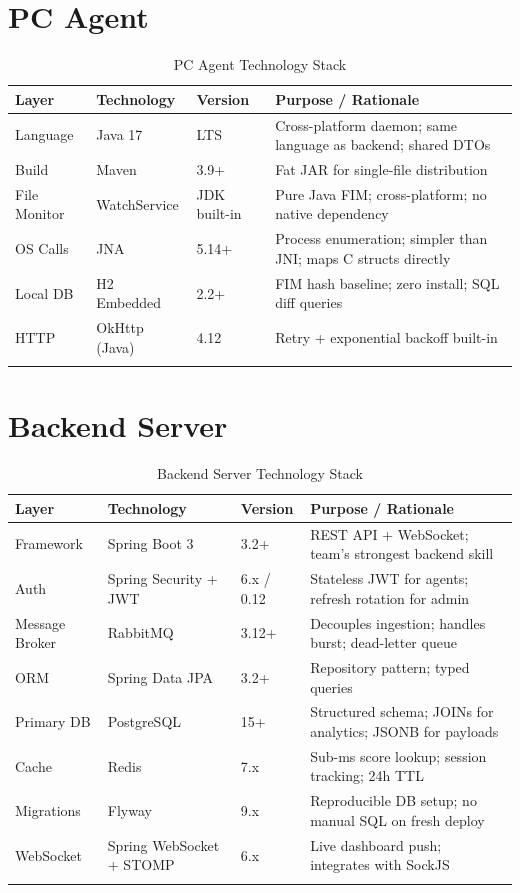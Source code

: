 \documentclass[12pt,a4paper]{report}
\begin{document}
\section{PC Agent}

\begin{longtable}{@{}p{2.5cm}p{3cm}p{2cm}p{6cm}@{}}
  \toprule
  \textbf{Layer} & \textbf{Technology} & \textbf{Version} & \textbf{Purpose / Rationale} \\
  \midrule
  \endhead
  Language    & Java 17         & LTS       & Cross-platform daemon; same language as backend; shared DTOs \\
  Build       & Maven           & 3.9+      & Fat JAR for single-file distribution \\
  File Monitor & WatchService   & JDK built-in & Pure Java FIM; cross-platform; no native dependency \\
  OS Calls    & JNA             & 5.14+     & Process enumeration; simpler than JNI; maps C structs directly \\
  Local DB    & H2 Embedded     & 2.2+      & FIM hash baseline; zero install; SQL diff queries \\
  HTTP        & OkHttp (Java)   & 4.12      & Retry + exponential backoff built-in \\
  \bottomrule
  \caption{PC Agent Technology Stack}
\end{longtable}

\section{Backend Server}

\begin{longtable}{@{}p{2.5cm}p{3.5cm}p{2cm}p{5.5cm}@{}}
  \toprule
  \textbf{Layer} & \textbf{Technology} & \textbf{Version} & \textbf{Purpose / Rationale} \\
  \midrule
  \endhead
  Framework   & Spring Boot 3   & 3.2+      & REST API + WebSocket; team's strongest backend skill \\
  Auth        & Spring Security + JWT & 6.x / 0.12 & Stateless JWT for agents; refresh rotation for admin \\
  Message Broker & RabbitMQ    & 3.12+     & Decouples ingestion; handles burst; dead-letter queue \\
  ORM         & Spring Data JPA & 3.2+      & Repository pattern; typed queries \\
  Primary DB  & PostgreSQL      & 15+       & Structured schema; JOINs for analytics; JSONB for payloads \\
  Cache       & Redis           & 7.x       & Sub-ms score lookup; session tracking; 24h TTL \\
  Migrations  & Flyway          & 9.x       & Reproducible DB setup; no manual SQL on fresh deploy \\
  WebSocket   & Spring WebSocket + STOMP & 6.x & Live dashboard push; integrates with SockJS \\
  \bottomrule
  \caption{Backend Server Technology Stack}
\end{longtable}
\end{document}
